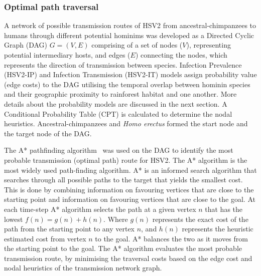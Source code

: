 \documentclass[fleqn,10pt]{wlscirep}
\begin{document}
\subsubsection*{Optimal path traversal}
A network of possible transmission routes of HSV2 from ancestral-chimpanzees to humans through different potential hominims was developed as a Directed Cyclic Graph (DAG) $G = (V, E)$ comprising of a set of nodes ($V$), representing potential intermediary hosts, and edges ($E$) connecting the nodes, which represents the direction of transmission between species. Infection Prevalence (HSV2-IP) and Infection Transmission (HSV2-IT) models assign probability value (edge costs) to the DAG utilising the temporal overlap between hominin species and their geographic proximity to rainforest habitat and one another. More details about the probability models are discussed in the next section. A Conditional Probability Table (CPT) is calculated to determine the nodal heuristics. Ancestral-chimpanzees and \textit{Homo erectus} formed the start node and the target node of the DAG. 

The A* pathfinding algorithm~\cite{Hart1968} was used on the DAG to identify the most probable transmission (optimal path) route for HSV2. The A* algorithm is the most widely used path-finding algorithm. A* is an informed search algorithm that searches through all possible paths to the target that yields the smallest cost. This is done by combining information on favouring vertices that are close to the starting point and information on favouring vertices that are close to the goal. At each time-step A* algorithm selects the path at a given vertex $n$ that has the lowest $f(n) = g(n) + h(n)$. Where $g(n)$ represents the exact cost of the path from the starting point to any vertex $n$, and $h(n)$ represents the heuristic estimated cost from vertex $n$ to the goal. A* balances the two as it moves from the starting point to the goal. The A* algorithm evaluates the most probable transmission route, by minimising the traversal costs based on the edge cost and nodal heuristics of the transmission network graph.
\end{document}
